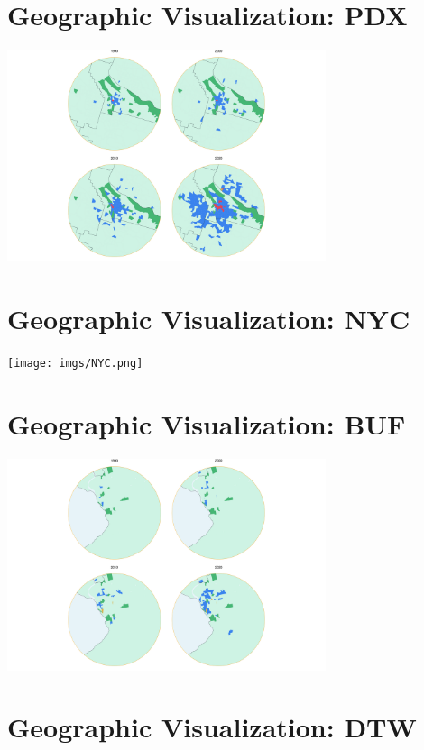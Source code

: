 \documentclass[
  letterpaper,
  DIV=11,
  numbers=noendperiod]{scrartcl}
\begin{document}
\hypertarget{geographic-visualization-pdx}{%
\section{Geographic Visualization:
PDX}\label{geographic-visualization-pdx}}

\includegraphics[width=0.7\textwidth,height=\textheight]{imgs/PDX.png}

\hypertarget{geographic-visualization-nyc}{%
\section{Geographic Visualization:
NYC}\label{geographic-visualization-nyc}}

\texttt{[image: imgs/NYC.png]}

\hypertarget{geographic-visualization-buf}{%
\section{Geographic Visualization:
BUF}\label{geographic-visualization-buf}}

\includegraphics[width=0.7\textwidth,height=\textheight]{imgs/BUF.png}

\hypertarget{geographic-visualization-dtw}{%
\section{Geographic Visualization:
DTW}\label{geographic-visualization-dtw}}
\end{document}
